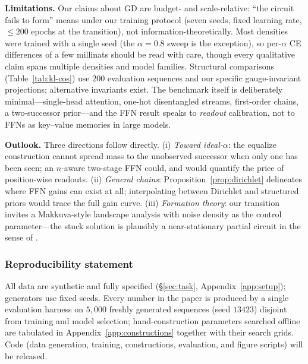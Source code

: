 \documentclass{article} %
\newcommand{\idealalpha}{\textsf{ideal-$\alpha$}}
\begin{document}
\textbf{Limitations.} Our claims about GD are budget- and scale-relative: ``the
circuit fails to form'' means under our training protocol (seven seeds, fixed
learning rate, ${\le}200$ epochs at the transition), not information-theoretically.
Most densities were trained with a single seed (the $\alpha=0.8$ sweep is the
exception), so per-$\alpha$ CE differences of a few millinats should be read with
care, though every qualitative claim spans multiple densities and model families.
Structural comparisons (Table~\ref{tab:kl-cos}) use $200$ evaluation sequences and
our specific gauge-invariant projections; alternative invariants exist. The
benchmark itself is deliberately minimal---single-head attention, one-hot
disentangled streams, first-order chains, a two-successor prior---and the FFN
result speaks to \emph{readout} calibration, not to FFNs as key--value memories in
large models.

\textbf{Outlook.} Three directions follow directly. (i) \emph{Toward \idealalpha{}}:
the equalize construction cannot spread mass to the unobserved successor when only
one has been seen; an $n$-aware two-stage FFN could, and would quantify the price of
position-wise readouts. (ii) \emph{General chains}: Proposition~\ref{prop:dirichlet}
delineates where FFN gains can exist at all; interpolating between Dirichlet and
structured priors would trace the full gain curve. (iii) \emph{Formation theory}: our
transition invites a Makkuva-style landscape analysis with noise density as the
control parameter---the stuck solution is plausibly a near-stationary partial
circuit in the sense of \citet{varre2025learning}.

\subsubsection*{Reproducibility statement}
All data are synthetic and fully specified (\S\ref{sec:task},
Appendix~\ref{app:setup}); generators use fixed seeds. Every number in the paper is
produced by a single evaluation harness on $5{,}000$ freshly generated sequences
(seed $13423$) disjoint from training and model selection; hand-construction
parameters searched offline are tabulated in Appendix~\ref{app:constructions}
together with their search grids. Code (data generation, training, constructions,
evaluation, and figure scripts) will be released.




\clearpage
\appendix
\end{document}
